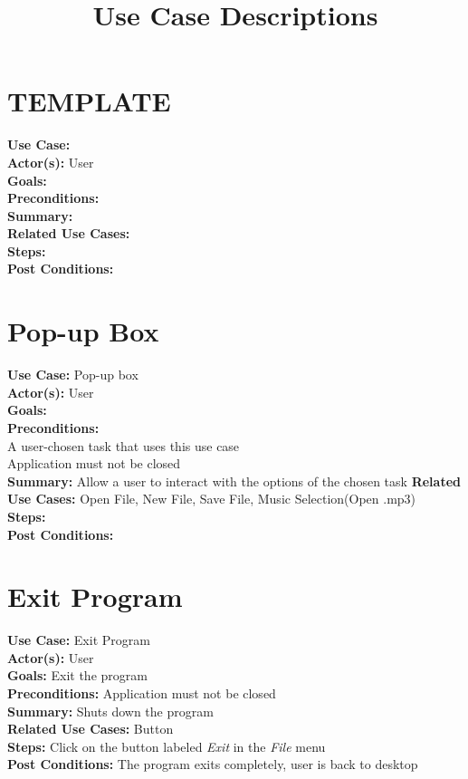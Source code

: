 \documentclass[12pt,a4paper]{article}
\begin{document}
\title{Use Case Descriptions}

\section*{TEMPLATE}
\textbf{Use Case:} \\
\textbf{Actor(s):} User \\ 
\textbf{Goals:} \\
\textbf{Preconditions:} \\
\textbf{Summary:} \\
\textbf{Related Use Cases:} \\
\textbf{Steps:} \\
\textbf{Post Conditions:} \\


\section*{Pop-up Box}
\textbf{Use Case:} Pop-up box \\
\textbf{Actor(s):} User \\ 
\textbf{Goals:} \\
\textbf{Preconditions:} \\
A user-chosen task that uses this use case \\
Application must not be closed \\
\textbf{Summary:} Allow a user to interact with the options of the chosen task
\textbf{Related Use Cases:} Open File, New File, Save File, Music Selection(Open .mp3) \\
\textbf{Steps:} \\
\textbf{Post Conditions:} \\

\section*{Exit Program}
\textbf{Use Case:} Exit Program \\
\textbf{Actor(s):} User \\ 
\textbf{Goals:} Exit the program \\
\textbf{Preconditions:} Application must not be closed \\
\textbf{Summary:} Shuts down the program \\
\textbf{Related Use Cases:} Button \\
\textbf{Steps:} Click on the button labeled \emph{Exit} in the \emph{File} menu \\
\textbf{Post Conditions:} The program exits completely, user is back to desktop \\
\end{document}
